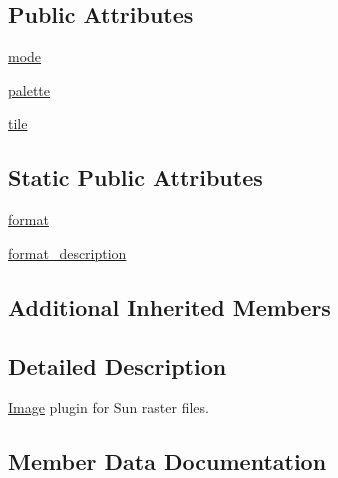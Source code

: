 \subsection*{Public Attributes}
\begin{DoxyCompactItemize}
\item 
\hyperlink{classPIL_1_1SunImagePlugin_1_1SunImageFile_a22a8b32e3cfea3a90d8d8672c74f2dbe}{mode}
\item 
\hyperlink{classPIL_1_1SunImagePlugin_1_1SunImageFile_a084033b7b75cb9fd4dd3756208669518}{palette}
\item 
\hyperlink{classPIL_1_1SunImagePlugin_1_1SunImageFile_ad6cb00740c730ebf22506e4525b8eca2}{tile}
\end{DoxyCompactItemize}
\subsection*{Static Public Attributes}
\begin{DoxyCompactItemize}
\item 
\hyperlink{classPIL_1_1SunImagePlugin_1_1SunImageFile_ae53511d8262d10ec1ccbe73d54900141}{format}
\item 
\hyperlink{classPIL_1_1SunImagePlugin_1_1SunImageFile_a91ab7ceeaad7e970a3121cc0c2fd4e5b}{format\+\_\+description}
\end{DoxyCompactItemize}
\subsection*{Additional Inherited Members}


\subsection{Detailed Description}
\hyperlink{namespacePIL_1_1Image}{Image} plugin for Sun raster files. 



\subsection{Member Data Documentation}
\mbox{\label{classPIL_1_1SunImagePlugin_1_1SunImageFile_ae53511d8262d10ec1ccbe73d54900141}} 
